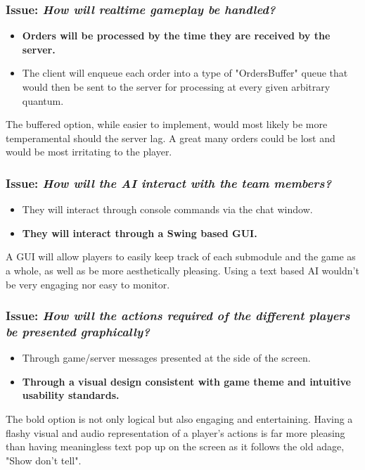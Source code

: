 \subsubsection*{Issue: \textit{How will realtime gameplay be handled?}}

  \begin{itemize}
    \item \textbf{Orders will be processed by the time they are received by the server.}
    \item The client will enqueue each order into a type of "OrdersBuffer" queue that would then be sent to the server for processing at every given arbitrary quantum.
  \end{itemize}

The buffered option, while easier to implement, would most likely be more temperamental should the server lag. A great many orders could be lost and would be most irritating to the player.

\subsubsection*{Issue: \textit{How will the AI interact with the team members?}}

  \begin{itemize}
    \item They will interact through console commands via the chat window.
    \item \textbf{They will interact through a Swing based GUI.}
  \end{itemize}

A GUI will allow players to easily keep track of each submodule and the game as a whole, as well as be more aesthetically pleasing. Using a text based AI wouldn't be very engaging nor easy to monitor.

\subsubsection*{Issue: \textit{How will the actions required of the different players be presented graphically?}}

  \begin{itemize}
    \item Through game/server messages presented at the side of the screen.
    \item \textbf{Through a visual design consistent with game theme and intuitive usability standards.}
  \end{itemize}

The bold option is not only logical but also engaging and entertaining. Having a flashy visual and audio representation of a player's actions is far more pleasing than having meaningless text pop up on the screen as it follows the old adage, "Show don't tell".
